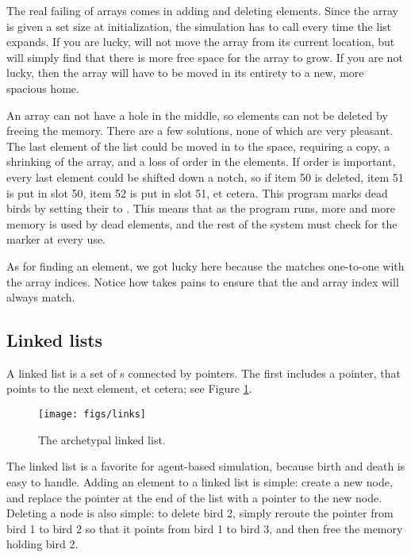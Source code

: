 The real failing of arrays comes in adding and deleting elements. Since
the array is given a set size at initialization,
the simulation has to call  every time the
list expands. If you are lucky,  will not move the array
from its current location, but will simply find that there is more free
space for the array to grow. If you are not lucky, then the array will
have to be moved in its entirety to a new, more spacious home.

An array can not have a hole in the middle, so elements can not be
deleted by freeing the memory. There are a few solutions, none of which
are very pleasant. The last element of the list could be moved in to the
space, requiring a copy, a shrinking of the array, and a loss of order
in the elements. If order is important, every last element could be
shifted down a notch, so if item 50 is deleted, item 51 is put in slot
50, item 52 is put in slot 51, et cetera. This program marks dead birds
by setting their  to . This means that as the program runs,
more and more memory is used by dead elements, and the rest of the system
must check for the marker at every use.

As for finding an element, we got lucky here because the  
matches one-to-one with the array indices. Notice how
 takes pains to ensure that the  and array
index will always match.


\subsection{Linked lists} A linked list is a set of s connected
by pointers. The first  includes a  pointer, that
points to the next element, et cetera; see Figure \ref{listfig}.

\begin{figure}[htb]
\begin{center}
\texttt{[image: figs/links]}
\end{center}
\caption{The archetypal linked list.}
\label{listfig}
\end{figure}

The linked list is a favorite for agent-based simulation, because birth
and death is easy to handle.  Adding an element to a linked list is
simple: create a new node, and replace the  pointer at
the end of the list with a pointer to the new node. Deleting a node is also simple:
to delete bird 2, simply reroute the  pointer from bird 1 to bird 2 so
that it points from bird 1 to bird 3, and then free the memory holding
bird 2.

